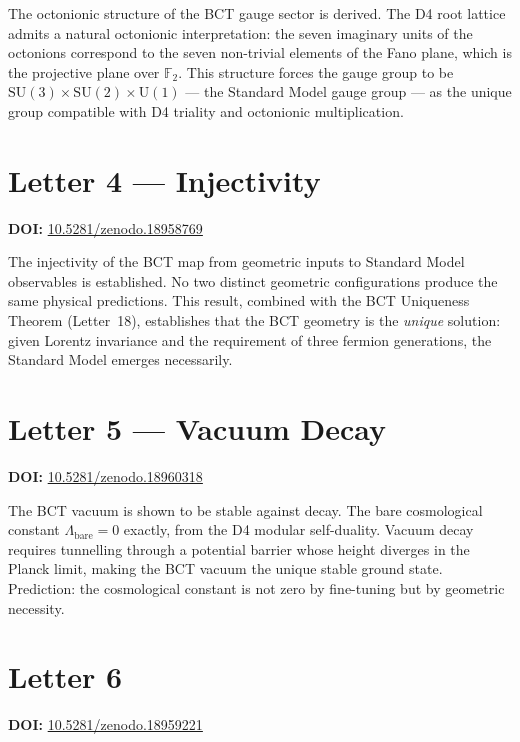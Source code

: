 \documentclass[aps,prl,twocolumn,showpacs,preprintnumbers]{revtex4-2}
\begin{document}
\medskip
The octonionic structure of the BCT gauge sector is derived. The
D4 root lattice admits a natural octonionic interpretation: the
seven imaginary units of the octonions correspond to the seven
non-trivial elements of the Fano plane, which is the projective
plane over $\mathbb{F}_2$. This structure forces the gauge group
to be $\mathrm{SU}(3) \times \mathrm{SU}(2) \times \mathrm{U}(1)$
--- the Standard Model gauge group --- as the unique group compatible
with D4 triality and octonionic multiplication.

\section{Letter 4 --- Injectivity}
\noindent\textbf{DOI:} \href{https://doi.org/10.5281/zenodo.18958769}{10.5281/zenodo.18958769}

\medskip
The injectivity of the BCT map from geometric inputs to Standard
Model observables is established. No two distinct geometric configurations
produce the same physical predictions. This result, combined with
the BCT Uniqueness Theorem (Letter~18), establishes that the BCT
geometry is the \emph{unique} solution: given Lorentz invariance
and the requirement of three fermion generations, the Standard Model
emerges necessarily.

\section{Letter 5 --- Vacuum Decay}
\noindent\textbf{DOI:} \href{https://doi.org/10.5281/zenodo.18960318}{10.5281/zenodo.18960318}

\medskip
The BCT vacuum is shown to be stable against decay. The bare
cosmological constant $\Lambda_{\mathrm{bare}} = 0$ exactly,
from the D4 modular self-duality. Vacuum decay requires tunnelling
through a potential barrier whose height diverges in the Planck
limit, making the BCT vacuum the unique stable ground state.
Prediction: the cosmological constant is not zero by fine-tuning
but by geometric necessity.

\section{Letter 6}
\noindent\textbf{DOI:} \href{https://doi.org/10.5281/zenodo.18959221}{10.5281/zenodo.18959221}
\end{document}
